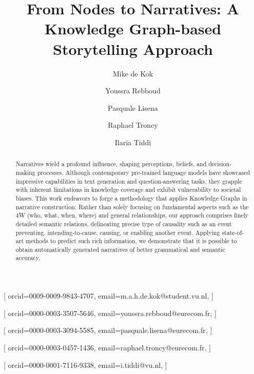 \documentclass[
]{ceurart}
\begin{document}


\title{From Nodes to Narratives: A Knowledge Graph-based Storytelling Approach}

\author[1,2]{Mike de Kok}[%
 orcid=0009-0009-9843-4707,
email=m.a.h.de.kok@student.vu.nl,
]
\cormark[1]

\author[2]{Youssra Rebboud}[%
  orcid=0000-0003-3507-5646,
  email=youssra.rebboud@eurecom.fr,
]
\cormark[1]


\author[2]{Pasquale Lisena}[%
  orcid=0000-0003-3094-5585,
  email=pasquale.lisena@eurecom.fr,
]
\author[2]{Raphael Troncy}[%
  orcid=0000-0003-0457-1436,
  email=raphael.troncy@eurecom.fr,
]

\author[1]{Ilaria Tiddi}[%
orcid=0000-0001-7116-9338,
email=i.tiddi@vu.nl,
]

\address[1]{Vrije Universiteit Amsterdam, Amsterdam, The Netherlands}


\address[2]{EURECOM, Sophia Antipolis, France}




\begin{abstract}
	Narratives wield a profound influence, shaping perceptions, beliefs, and decision-making processes. Although contemporary pre-trained language models have showcased impressive capabilities in text generation and question-answering tasks, they grapple with inherent limitations in knowledge coverage and exhibit vulnerability to societal biases. This work endeavors to forge a methodology that applies Knowledge Graphs in narrative construction. Rather than solely focusing on fundamental aspects such as the 4W (who, what, when, where) and general relationships, our approach comprises finely detailed semantic relations, delineating precise type of causality such as an event preventing, intending-to-cause, causing, or enabling another event. Applying state-of-art methods to predict such rich information, we demonstrate that it is possible to obtain automatically generated narratives of better grammatical and semantic accuracy.
\end{abstract}
\end{document}
